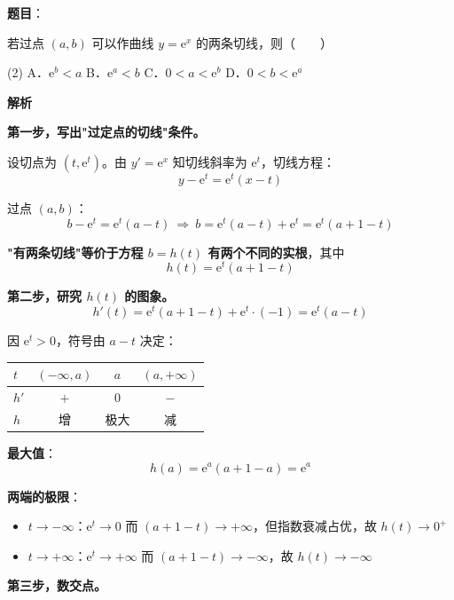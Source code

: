 \begin{answer}

\textbf{题目}：

若过点 $(a,b)$ 可以作曲线 $y=\mathrm e^{x}$ 的两条切线，则\mbox{（　　）}

\begin{gkopts}(2)
\task A．$\mathrm e^{b}<a$
\task B．$\mathrm e^{a}<b$
\task C．$0<a<\mathrm e^{b}$
\task D．$0<b<\mathrm e^{a}$
\end{gkopts}

\textbf{解析}

\textbf{第一步，写出"过定点的切线"条件。}

设切点为 $\left(t,\mathrm e^{t}\right)$。由 $y'=\mathrm e^{x}$ 知切线斜率为 $\mathrm e^{t}$，切线方程：
\nopagebreak[4]
\[y-\mathrm e^{t}=\mathrm e^{t}(x-t)\]

过点 $(a,b)$：
\nopagebreak[4]
\[b-\mathrm e^{t}=\mathrm e^{t}(a-t)\ \Longrightarrow\ b=\mathrm e^{t}(a-t)+\mathrm e^{t}=\mathrm e^{t}(a+1-t)\]

\textbf{"有两条切线"等价于方程 $b=h(t)$ 有两个不同的实根}，其中
\nopagebreak[4]
\[h(t)=\mathrm e^{t}(a+1-t)\]

\textbf{第二步，研究 $h(t)$ 的图象。}
\nopagebreak[4]
\[h'(t)=\mathrm e^{t}(a+1-t)+\mathrm e^{t}\cdot(-1)=\mathrm e^{t}(a-t)\]

因 $\mathrm e^{t}>0$，符号由 $a-t$ 决定：

\begin{center}
\begin{tabular}{lccc}
\toprule
$t$ & $(-\infty,a)$ & $a$ & $(a,+\infty)$ \\
\midrule
$h'$ & $+$ & $0$ & $-$ \\
$h$ & 增 & 极大 & 减 \\
\bottomrule
\end{tabular}
\end{center}

\textbf{最大值}：
\nopagebreak[4]
\[h(a)=\mathrm e^{a}(a+1-a)=\mathrm e^{a}\]

\textbf{两端的极限}：
\begin{itemize}
\item $t\to-\infty$：$\mathrm e^{t}\to0$ 而 $(a+1-t)\to+\infty$，但指数衰减占优，故 $h(t)\to0^{+}$
\item $t\to+\infty$：$\mathrm e^{t}\to+\infty$ 而 $(a+1-t)\to-\infty$，故 $h(t)\to-\infty$
\end{itemize}

\textbf{第三步，数交点。}


\end{answer}
